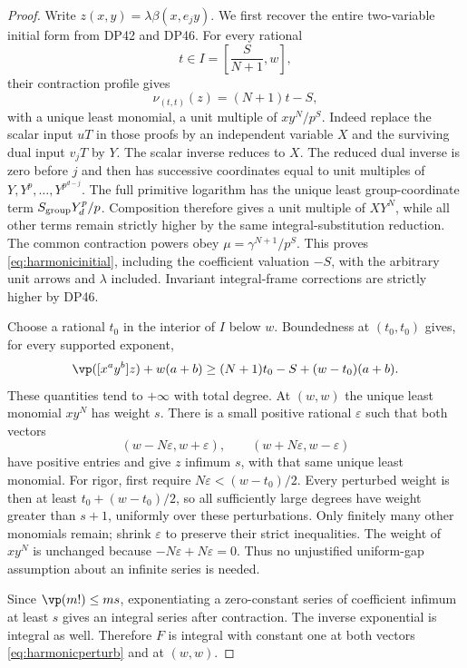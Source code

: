 \begin{proof}
Write $z(x,y)=\lambda\beta(x,e_jy)$.
We first recover the entire two-variable initial form from DP42 and DP46.
For every rational
\[
 t\in I=\left[\frac{S}{N+1},w\right],
\]
their contraction profile gives
\begin{equation}\label{eq:harmonicinitial}
 \nu_{(t,t)}(z)=(N+1)t-S,
\end{equation}
with a unique least monomial, a unit multiple of $xy^N/p^S$.
Indeed replace the scalar input $uT$ in those proofs by an independent variable $X$ and the surviving dual input $v_jT$ by $Y$.
The scalar inverse reduces to $X$.
The reduced dual inverse is zero before $j$ and then has successive coordinates equal to unit multiples of $Y,Y^p,\ldots,Y^{p^{d-j}}$.
The full primitive logarithm has the unique least group-coordinate term $S_{\rm group}Y_d^p/p$.
Composition therefore gives a unit multiple of $XY^N$, while all other terms remain strictly higher by the same integral-substitution reduction.
The common contraction powers obey $\mu=\gamma^{N+1}/p^S$.
This proves \eqref{eq:harmonicinitial}, including the coefficient valuation $-S$, with the arbitrary unit arrows and $\lambda$ included.
Invariant integral-frame corrections are strictly higher by DP46.

Choose a rational $t_0$ in the interior of $I$ below $w$.
Boundedness at $(t_0,t_0)$ gives, for every supported exponent,
\[
 \vp([x^ay^b]z)+w(a+b)
 \ge (N+1)t_0-S+(w-t_0)(a+b).
\]
These quantities tend to $+\infty$ with total degree.
At $(w,w)$ the unique least monomial $xy^N$ has weight $s$.
There is a small positive rational $\varepsilon$ such that both vectors
\begin{equation}\label{eq:harmonicperturb}
 (w-N\varepsilon,w+\varepsilon),\qquad
 (w+N\varepsilon,w-\varepsilon)
\end{equation}
have positive entries and give $z$ infimum $s$, with that same unique least monomial.
For rigor, first require $N\varepsilon<(w-t_0)/2$.
Every perturbed weight is then at least $t_0+(w-t_0)/2$, so all sufficiently large degrees have weight greater than $s+1$, uniformly over these perturbations.
Only finitely many other monomials remain; shrink $\varepsilon$ to preserve their strict inequalities.
The weight of $xy^N$ is unchanged because $-N\varepsilon+N\varepsilon=0$.
Thus no unjustified uniform-gap assumption about an infinite series is needed.

Since $\vp(m!)\le ms$, exponentiating a zero-constant series of coefficient infimum at least $s$ gives an integral series after contraction.
The inverse exponential is integral as well.
Therefore $F$ is integral with constant one at both vectors \eqref{eq:harmonicperturb} and at $(w,w)$.


\end{proof}
